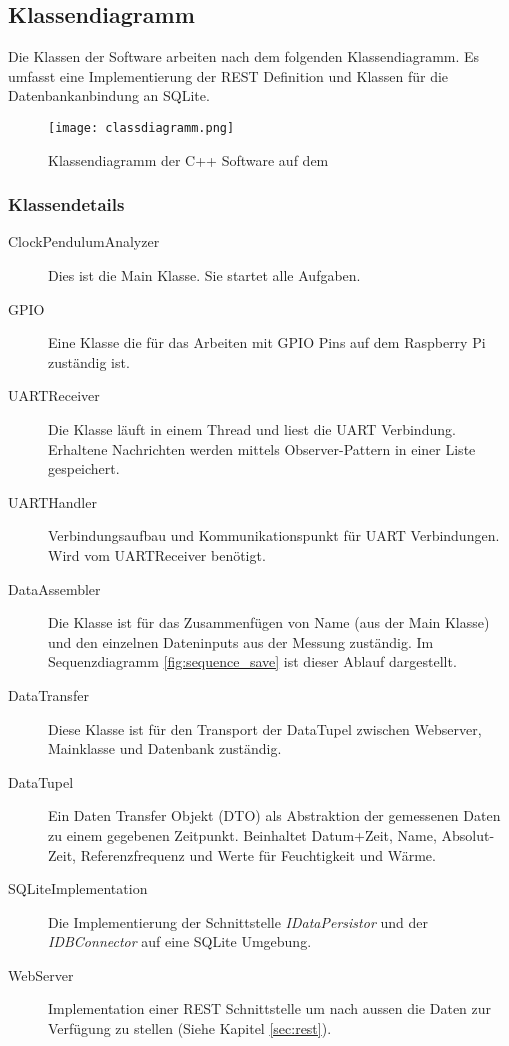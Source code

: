 \subsection{Klassendiagramm}
Die Klassen der Software arbeiten nach dem folgenden Klassendiagramm. Es umfasst eine Implementierung der REST Definition und Klassen für die Datenbankanbindung an SQLite.
\begin{figure}[H]
    \centering
    \texttt{[image: classdiagramm.png]}
    \caption{Klassendiagramm der C++ Software auf dem \rpi}
\end{figure}
\subsubsection{Klassendetails}
	\begin{description}
        \item[ClockPendulumAnalyzer] Dies ist die Main Klasse. Sie startet alle Aufgaben.
        \item[GPIO] Eine Klasse die für das Arbeiten mit GPIO Pins auf dem Raspberry Pi zuständig ist.
        \item[UARTReceiver] Die Klasse läuft in einem Thread und liest die UART Verbindung. Erhaltene Nachrichten werden mittels Observer-Pattern in einer Liste gespeichert.
        \item[UARTHandler] Verbindungsaufbau und Kommunikationspunkt für UART Verbindungen. Wird vom UARTReceiver benötigt.
        \item[DataAssembler] Die Klasse ist für das Zusammenfügen von Name (aus der Main Klasse) und den einzelnen Dateninputs aus der Messung zuständig. Im Sequenzdiagramm \ref{fig:sequence_save} ist dieser Ablauf dargestellt. 
        \item[DataTransfer] Diese Klasse ist für den Transport der DataTupel zwischen Webserver, Mainklasse und Datenbank zuständig.
        \item[DataTupel] Ein Daten Transfer Objekt (DTO) als Abstraktion der gemessenen Daten zu einem gegebenen Zeitpunkt. Beinhaltet Datum+Zeit, Name, Absolut-Zeit, Referenzfrequenz und Werte für Feuchtigkeit und Wärme.
        \item[SQLiteImplementation] Die Implementierung der Schnittstelle \textit{IDataPersistor} und der \textit{IDBConnector} auf eine SQLite Umgebung.
        \item[WebServer] Implementation einer REST Schnittstelle um nach aussen die Daten zur Verfügung zu stellen (Siehe Kapitel \ref{sec:rest}).
    \end{description}

